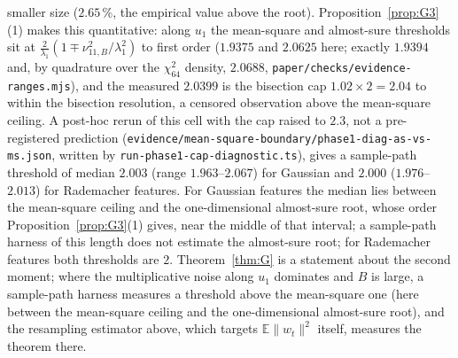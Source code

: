 \documentclass[11pt]{article}
\theoremstyle{remark}
\newcommand{\E}{\mathbb{E}}
\begin{document}
smaller size ($2.65\,\%$, the empirical value above the root). Proposition~\ref{prop:G3}(1) makes this quantitative: along $u_1$ the mean-square and almost-sure thresholds sit at $\frac2{\lambda_1}(1\mp\nu_{11,B}^2/\lambda_1^2)$ to first order ($1.9375$ and $2.0625$ here; exactly $1.9394$ and, by quadrature over the $\chi^2_{64}$ density, $2.0688$, \texttt{paper/checks/evidence-ranges.mjs}), and the measured $2.0399$ is the bisection cap $1.02\times2=2.04$ to within the bisection resolution, a censored observation above the mean-square ceiling. A post-hoc rerun of this cell with the cap raised to $2.3$, not a pre-registered prediction (\texttt{evidence/mean-square-boundary/phase1-diag-as-vs-ms.json}, written by \texttt{run-phase1-cap-diagnostic.ts}), gives a sample-path threshold of median $2.003$ (range $1.963$--$2.067$) for Gaussian and $2.000$ ($1.976$--$2.013$) for Rademacher features. For Gaussian features the median lies between the mean-square ceiling and the one-dimensional almost-sure root, whose order Proposition~\ref{prop:G3}(1) gives, near the middle of that interval; a sample-path harness of this length does not estimate the almost-sure root; for Rademacher features both thresholds are $2$. Theorem~\ref{thm:G} is a statement about the second moment; where the multiplicative noise along $u_1$ dominates and $B$ is large, a sample-path harness measures a threshold above the mean-square one (here between the mean-square ceiling and the one-dimensional almost-sure root), and the resampling estimator above, which targets $\E\|w_t\|^2$ itself, measures the theorem there.
\end{document}
